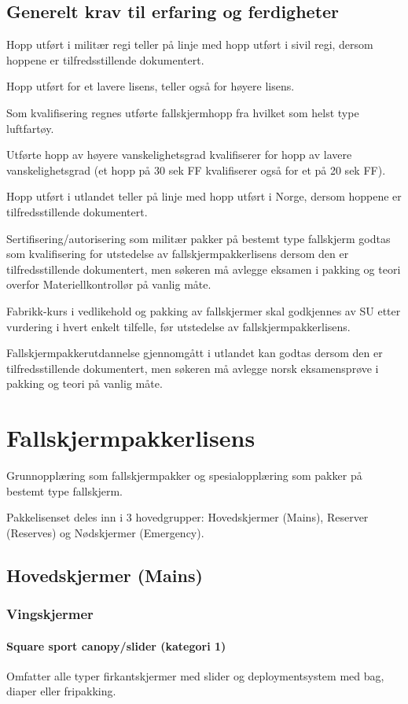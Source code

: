\subsection{Generelt krav til erfaring og ferdigheter}
Hopp utført i militær regi teller på linje med hopp utført i sivil regi, dersom hoppene er tilfredsstillende dokumentert.

Hopp utført for et lavere lisens, teller også for høyere lisens.

Som kvalifisering regnes utførte fallskjermhopp fra hvilket som helst type luftfartøy.

Utførte hopp av høyere vanskelighetsgrad kvalifiserer for hopp av lavere vanskelighetsgrad (et hopp på 30 sek FF kvalifiserer også for et på 20 sek FF).

Hopp utført i utlandet teller på linje med hopp utført i Norge, dersom hoppene er tilfredsstillende dokumentert.

Sertifisering/autorisering som militær pakker på bestemt type fallskjerm godtas som kvalifisering for utstedelse av fallskjermpakkerlisens dersom den er tilfredsstillende dokumentert, men søkeren må avlegge eksamen i pakking og teori overfor Materiellkontrollør på vanlig måte.

Fabrikk-kurs i vedlikehold og pakking av fallskjermer skal godkjennes av SU etter vurdering i hvert enkelt tilfelle, før utstedelse av fallskjermpakkerlisens.

Fallskjermpakkerutdannelse gjennomgått i utlandet kan godtas dersom den er tilfredsstillende dokumentert, men søkeren må avlegge norsk eksamensprøve i pakking og teori på vanlig måte.

\section{Fallskjermpakkerlisens}
Grunnopplæring som fallskjermpakker og spesialopplæring som pakker på bestemt type fallskjerm.

Pakkelisenset deles inn i 3 hovedgrupper: Hovedskjermer (Mains), Reserver (Reserves) og Nødskjermer (Emergency).

\subsection{Hovedskjermer (Mains)}
\subsubsection{Vingskjermer}
\paragraph{Square sport canopy/slider (kategori 1)}
Omfatter alle typer firkantskjermer med slider og deploymentsystem med bag, diaper eller fripakking.


